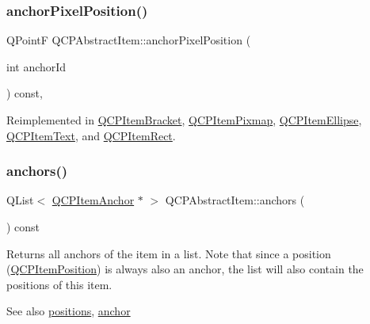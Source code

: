 \subsubsection{\texorpdfstring{anchorPixelPosition()}{anchorPixelPosition()}}
{\footnotesize\ttfamily Q\+PointF Q\+C\+P\+Abstract\+Item\+::anchor\+Pixel\+Position (\begin{DoxyParamCaption}\item[{int}]{anchor\+Id }\end{DoxyParamCaption}) const\hspace{0.3cm}{\ttfamily [protected]}, {\ttfamily [virtual]}}



Reimplemented in \mbox{\hyperlink{class_q_c_p_item_bracket_a008d87325d26b6616d368cec06027cce}{Q\+C\+P\+Item\+Bracket}}, \mbox{\hyperlink{class_q_c_p_item_pixmap_a5803d8e173bc4d48619fc43701db32e5}{Q\+C\+P\+Item\+Pixmap}}, \mbox{\hyperlink{class_q_c_p_item_ellipse_a35cd6983c61a16ac33c23f08dd2817cc}{Q\+C\+P\+Item\+Ellipse}}, \mbox{\hyperlink{class_q_c_p_item_text_afcdb1724d88d561f65da95fb54b0acb7}{Q\+C\+P\+Item\+Text}}, and \mbox{\hyperlink{class_q_c_p_item_rect_a844027325b33a3b7eef424128ee5109c}{Q\+C\+P\+Item\+Rect}}.

\mbox{\label{class_q_c_p_abstract_item_a81d1ecfea3368b836cf9675a0045e659}} 
\subsubsection{\texorpdfstring{anchors()}{anchors()}}
{\footnotesize\ttfamily Q\+List$<$ \mbox{\hyperlink{class_q_c_p_item_anchor}{Q\+C\+P\+Item\+Anchor}} $\ast$ $>$ Q\+C\+P\+Abstract\+Item\+::anchors (\begin{DoxyParamCaption}{ }\end{DoxyParamCaption}) const\hspace{0.3cm}{\ttfamily [inline]}}

Returns all anchors of the item in a list. Note that since a position (\mbox{\hyperlink{class_q_c_p_item_position}{Q\+C\+P\+Item\+Position}}) is always also an anchor, the list will also contain the positions of this item.

\begin{DoxySeeAlso}{See also}
\mbox{\hyperlink{class_q_c_p_abstract_item_a709f655ac3f7f22d452714134662b454}{positions}}, \mbox{\hyperlink{class_q_c_p_abstract_item_a139c255ea8831642fac91748e29a5adb}{anchor}} 
\end{DoxySeeAlso}
\mbox{\label{class_q_c_p_abstract_item_a5579ce9ec7cad202499886b042448b10}} 
